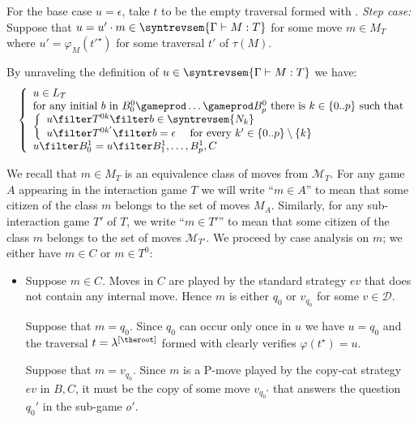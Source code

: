 \begin{itemize}[$\bullet$]
\begin{enumerate}
    For the base case $u=\epsilon$, take $t$ to be the empty traversal formed with .
    \emph{Step case:} Suppose that $u = u' \cdot m \in
    \syntrevsem{\Gamma \vdash M : T}$ for some move $m \in
    M_T$ where $u' = \varphi_M(t'^\star)$ for some traversal
    $t'$ of $\tau(M)$.

    By unraveling the definition of $u \in \syntrevsem{\Gamma \vdash M : T}$ we have:
    \begin{eqnarray*}
    && \left\{
    \begin{array}{ll}
        u \in L_T \\
        \hbox{for any initial $b$ in $B_0^0 \gameprod \ldots \gameprod B_p^0$ there is $k \in \{0..p\}$ such that } \\
        \left\{\begin{array}{ll}
            u \filter T^{0k} \filter b  \in \syntrevsem{N_k} \\
            u \filter T^{0k'} \filter b  = \epsilon \quad \mbox{ for every } k'\in \{0..p\}\setminus\{k\}
        \end{array}
        \right. \\
        u \filter B^1_0 = u \filter B^1_1, \ldots, B^1_p, C
    \end{array}
    \right.
    \end{eqnarray*}

We recall that $m \in M_T$ is an equivalence class of moves
from $\mathcal{M}_T$. For any game $A$ appearing in the
interaction game $T$ we will write ``$m \in A$'' to mean
that some citizen of the class $m$ belongs to the set of
moves $M_A$. Similarly, for any sub-interaction game $T'$ of
$T$, we write ``$m \in T'$'' to mean that some citizen of
the class $m$ belongs to the set of moves
$\mathcal{M}_{T'}$. We proceed by case analysis on $m$; we either have $m\in C$ or $m\in T^0$:
    \begin{itemize}
    \item Suppose $m \in C$. Moves in $C$ are played by the standard strategy $ev$ that does not contain any internal move. Hence $m$ is either $q_0$ or $v_{q_0}$ for some $v\in\mathcal{D}$.

    Suppose that $m=q_0$. Since $q_0$ can occur only once in
    $u$ we have $u=q_0$ and the traversal $t=\lambda^{[\theroot]}$ formed with  clearly verifies $\varphi(t^\star) = u$.

    Suppose that $m=v_{q_0}$. Since $m$ is a P-move played by the
    copy-cat strategy $ev$ in $B,C$, it must be the copy of some move $v_{q_0'}$ that answers the question $q_0'$ in the sub-game $o'$.


\end{itemize}
\end{enumerate}
\end{itemize}

